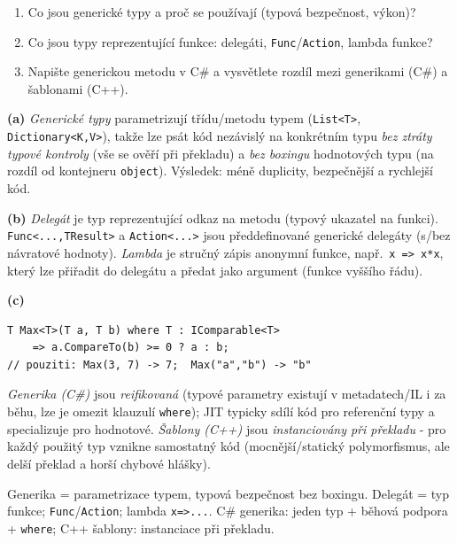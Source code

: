 \begin{zadani}
\begin{enumerate}[label=(\alph*)]
  \item {} Co jsou generické typy a proč se používají (typová bezpečnost, výkon)?
  \item {} Co jsou typy reprezentující funkce: delegáti, \texttt{Func}/\texttt{Action}, lambda funkce?
  \item {} Napište generickou metodu v C\# a vysvětlete rozdíl mezi generikami (C\#) a šablonami (C++).
\end{enumerate}
\end{zadani}

\begin{reseni}
\textbf{(a)} \emph{Generické typy} parametrizují třídu/metodu typem (\texttt{List<T>}, \texttt{Dictionary<K,V>}), takže lze psát kód nezávislý na konkrétním typu \emph{bez ztráty typové kontroly} (vše se ověří při překladu) a \emph{bez boxingu} hodnotových typu (na rozdíl od kontejneru \texttt{object}). Výsledek: méně duplicity, bezpečnější a rychlejší kód.

\textbf{(b)} \emph{Delegát} je typ reprezentující odkaz na metodu (typový ukazatel na funkci). \texttt{Func<...,TResult>} a \texttt{Action<...>} jsou předdefinované generické delegáty (s/bez návratové hodnoty). \emph{Lambda} je stručný zápis anonymní funkce, např.\ \texttt{x => x*x}, který lze přiřadit do delegátu a předat jako argument (funkce vyššího řádu).

\textbf{(c)}
\begin{lstlisting}
T Max<T>(T a, T b) where T : IComparable<T>
    => a.CompareTo(b) >= 0 ? a : b;
// pouziti: Max(3, 7) -> 7;  Max("a","b") -> "b"
\end{lstlisting}
\emph{Generika (C\#)} jsou \emph{reifikovaná} (typové parametry existují v metadatech/IL i za běhu, lze je omezit klauzulí \texttt{where}); JIT typicky sdílí kód pro referenční typy a specializuje pro hodnotové. \emph{Šablony (C++)} jsou \emph{instanciovány při překladu} - pro každý použitý typ vznikne samostatný kód (mocnější/statický polymorfismus, ale delší překlad a horší chybové hlášky).
\end{reseni}

\begin{jadro}
Generika = parametrizace typem, typová bezpečnost bez boxingu. Delegát = typ funkce; \texttt{Func}/\texttt{Action}; lambda \texttt{x=>...}. C\# generika: jeden typ + běhová podpora + \texttt{where}; C++ šablony: instanciace při překladu.
\end{jadro}

